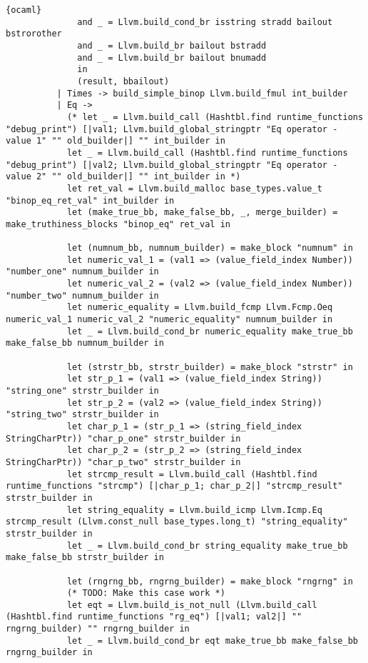 \begin{lstlisting}{ocaml}
              and _ = Llvm.build_cond_br isstring stradd bailout bstrorother
              and _ = Llvm.build_br bailout bstradd
              and _ = Llvm.build_br bailout bnumadd
              in
              (result, bbailout)
          | Times -> build_simple_binop Llvm.build_fmul int_builder
          | Eq ->
            (* let _ = Llvm.build_call (Hashtbl.find runtime_functions "debug_print") [|val1; Llvm.build_global_stringptr "Eq operator - value 1" "" old_builder|] "" int_builder in
            let _ = Llvm.build_call (Hashtbl.find runtime_functions "debug_print") [|val2; Llvm.build_global_stringptr "Eq operator - value 2" "" old_builder|] "" int_builder in *)
            let ret_val = Llvm.build_malloc base_types.value_t "binop_eq_ret_val" int_builder in
            let (make_true_bb, make_false_bb, _, merge_builder) = make_truthiness_blocks "binop_eq" ret_val in

            let (numnum_bb, numnum_builder) = make_block "numnum" in
            let numeric_val_1 = (val1 => (value_field_index Number)) "number_one" numnum_builder in
            let numeric_val_2 = (val2 => (value_field_index Number)) "number_two" numnum_builder in
            let numeric_equality = Llvm.build_fcmp Llvm.Fcmp.Oeq numeric_val_1 numeric_val_2 "numeric_equality" numnum_builder in
            let _ = Llvm.build_cond_br numeric_equality make_true_bb make_false_bb numnum_builder in

            let (strstr_bb, strstr_builder) = make_block "strstr" in
            let str_p_1 = (val1 => (value_field_index String)) "string_one" strstr_builder in
            let str_p_2 = (val2 => (value_field_index String)) "string_two" strstr_builder in
            let char_p_1 = (str_p_1 => (string_field_index StringCharPtr)) "char_p_one" strstr_builder in
            let char_p_2 = (str_p_2 => (string_field_index StringCharPtr)) "char_p_two" strstr_builder in
            let strcmp_result = Llvm.build_call (Hashtbl.find runtime_functions "strcmp") [|char_p_1; char_p_2|] "strcmp_result" strstr_builder in
            let string_equality = Llvm.build_icmp Llvm.Icmp.Eq strcmp_result (Llvm.const_null base_types.long_t) "string_equality" strstr_builder in
            let _ = Llvm.build_cond_br string_equality make_true_bb make_false_bb strstr_builder in

            let (rngrng_bb, rngrng_builder) = make_block "rngrng" in
            (* TODO: Make this case work *)
            let eqt = Llvm.build_is_not_null (Llvm.build_call (Hashtbl.find runtime_functions "rg_eq") [|val1; val2|] "" rngrng_builder) "" rngrng_builder in
            let _ = Llvm.build_cond_br eqt make_true_bb make_false_bb rngrng_builder in


\end{lstlisting}
